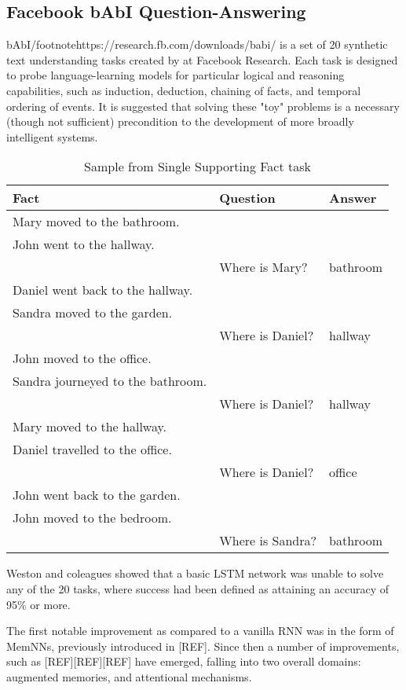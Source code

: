 \documentclass{article}
\begin{document}
\subsection{Facebook bAbI Question-Answering}

bAbI/footnote{https://research.fb.com/downloads/babi/} is a set of 20 synthetic text understanding tasks created by \citet{2015arXiv150205698W} at Facebook Research. Each task is designed to probe language-learning models for particular logical and reasoning capabilities, such as induction, deduction, chaining of facts, and temporal ordering of events. It is suggested that solving these "toy" problems is a necessary (though not sufficient) precondition to the development of more broadly intelligent systems. 

\begin{table}[h]
\caption{Sample from Single Supporting Fact task}
\centering
\begin{tabular}{|l|l|l|}
\hline
Fact & Question & Answer \\
\hline
Mary moved to the bathroom. & & \\
John went to the hallway. & & \\
 & Where is Mary? & bathroom \\
Daniel went back to the hallway. & & \\
Sandra moved to the garden. & & \\
 & Where is Daniel? & hallway \\
John moved to the office. & & \\
Sandra journeyed to the bathroom. & & \\
& Where is Daniel? & hallway \\
Mary moved to the hallway. & & \\
Daniel travelled to the office. & & \\
& Where is Daniel? & office \\
John went back to the garden. & & \\
John moved to the bedroom. & & \\
& Where is Sandra? & bathroom \\
\hline
\end{tabular}
\end{table}

Weston and coleagues showed that a basic LSTM network was unable to solve any of the 20 tasks, where success had been defined as attaining an accuracy of 95\% or more.

The first notable improvement as compared to a vanilla RNN was in the form of MemNNs, previously introduced in [REF]. Since then a number of improvements, such as [REF][REF][REF] have emerged, falling into two overall domains: augmented memories, and attentional mechanisms.
\end{document}
